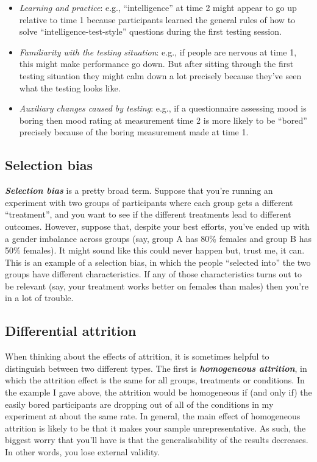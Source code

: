 \documentclass[
]{book}
\providecommand{\tightlist}{%
  \setlength{\itemsep}{0pt}\setlength{\parskip}{0pt}}
\begin{document}
\begin{itemize}
\tightlist
\item
  \emph{Learning and practice}: e.g., ``intelligence'' at time 2 might appear to go up relative to time 1 because participants learned the general rules of how to solve ``intelligence-test-style'' questions during the first testing session.\\
\item
  \emph{Familiarity with the testing situation}: e.g., if people are nervous at time 1, this might make performance go down. But after sitting through the first testing situation they might calm down a lot precisely because they've seen what the testing looks like.
\item
  \emph{Auxiliary changes caused by testing}: e.g., if a questionnaire assessing mood is boring then mood rating at measurement time 2 is more likely to be ``bored'' precisely because of the boring measurement made at time 1.
\end{itemize}

\hypertarget{selection-bias}{%
\subsection{Selection bias}\label{selection-bias}}

\textbf{\emph{Selection bias}} is a pretty broad term. Suppose that you're running an experiment with two groups of participants where each group gets a different ``treatment'', and you want to see if the different treatments lead to different outcomes. However, suppose that, despite your best efforts, you've ended up with a gender imbalance across groups (say, group A has 80\% females and group B has 50\% females). It might sound like this could never happen but, trust me, it can. This is an example of a selection bias, in which the people ``selected into'' the two groups have different characteristics. If any of those characteristics turns out to be relevant (say, your treatment works better on females than males) then you're in a lot of trouble.

\hypertarget{differentialattrition}{%
\subsection{Differential attrition}\label{differentialattrition}}

When thinking about the effects of attrition, it is sometimes helpful to distinguish between two different types. The first is \textbf{\emph{homogeneous attrition}}, in which the attrition effect is the same for all groups, treatments or conditions. In the example I gave above, the attrition would be homogeneous if (and only if) the easily bored participants are dropping out of all of the conditions in my experiment at about the same rate. In general, the main effect of homogeneous attrition is likely to be that it makes your sample unrepresentative. As such, the biggest worry that you'll have is that the generalisability of the results decreases. In other words, you lose external validity.
\end{document}
